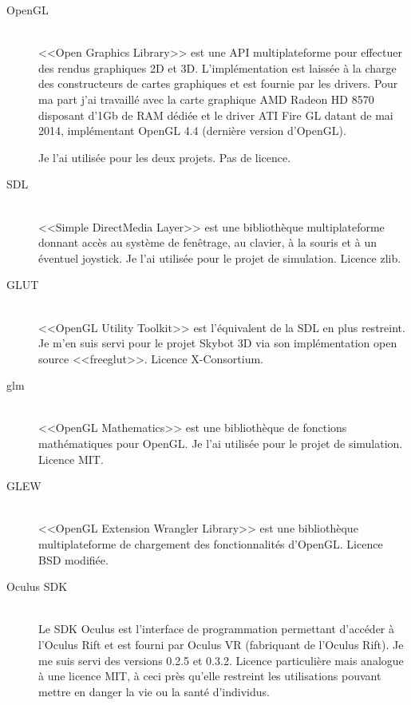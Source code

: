 \documentclass[a4paper,french,12pt]{article}
\begin{document}
		  \begin{description}
		   \item [OpenGL] ~\\
		      <<Open Graphics Library>> est une API multiplateforme pour effectuer des rendus graphiques 2D et 3D.
		      L'implémentation est laissée à la charge des constructeurs de cartes graphiques et est fournie
		      par les drivers. Pour ma part j'ai travaillé avec la carte graphique AMD Radeon HD 8570 disposant d'1Gb de RAM dédiée  
		      et le driver ATI Fire GL datant de mai 2014, implémentant OpenGL 4.4 (dernière version d'OpenGL).
		      
		      Je l'ai utilisée pour les deux projets.
		      Pas de licence.
		      
		   \item [SDL]~\\
		      <<Simple DirectMedia Layer>> est une bibliothèque multiplateforme donnant accès au système de fenêtrage,
		      au clavier, à la souris et à un éventuel joystick. Je l'ai utilisée pour le projet de simulation.
		      Licence zlib.
		      
		   \item [GLUT]~\\
		      <<OpenGL Utility Toolkit>> est l'équivalent de la SDL en plus restreint. Je m'en suis servi pour le 
		      projet Skybot 3D via son implémentation open source <<freeglut>>.
		      Licence X-Consortium.
		      
		   \item [glm]~\\
		      <<OpenGL Mathematics>> est une bibliothèque de fonctions mathématiques pour OpenGL.
		      Je l'ai utilisée pour le projet de simulation.
		      Licence MIT.
		   
		   \item [GLEW]~\\
		      <<OpenGL Extension Wrangler Library>> est une bibliothèque multiplateforme de chargement des fonctionnalités d'OpenGL.
		      Licence BSD modifiée.
		      
		   \item [Oculus SDK]~\\
		      Le SDK Oculus est l'interface de programmation permettant d'accéder à l'Oculus Rift et est fourni
		      par Oculus VR (fabriquant de l'Oculus Rift). 
		      Je me suis servi des versions 0.2.5 et 0.3.2.
		      Licence particulière mais analogue à une licence MIT, à ceci près qu'elle restreint les utilisations
		      pouvant mettre en danger la vie ou la santé d'individus.
		      
		  \end{description}
\end{document}

